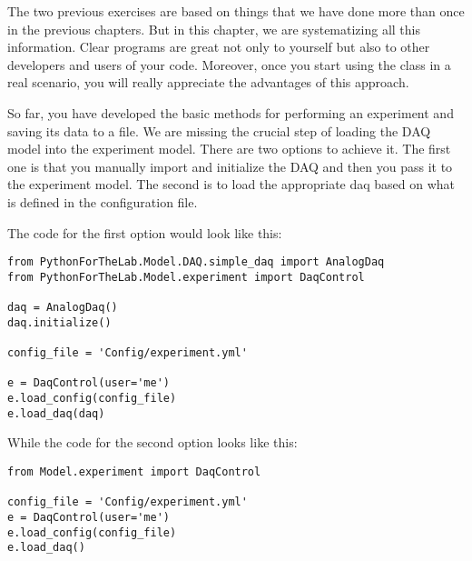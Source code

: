 
The two previous exercises are based on things that we have done more than once in the previous chapters. But in this chapter, we are systematizing all this information. Clear programs are great not only to yourself but also to other developers and users of your code. Moreover, once you start using the class in a real scenario, you will really appreciate the advantages of this approach.


So far, you have developed the basic methods for performing an experiment and saving its data to a file. We are missing the crucial step of loading the {DAQ} model into the experiment model. There are two options to achieve it. The first one is that you manually import and initialize the {DAQ} and then you pass it to the experiment model. The second is to load the appropriate daq based on what is defined in the configuration file.

The code for the first option would look like this:

\begin{verbatim}
from PythonForTheLab.Model.DAQ.simple_daq import AnalogDaq
from PythonForTheLab.Model.experiment import DaqControl

daq = AnalogDaq()
daq.initialize()

config_file = 'Config/experiment.yml'

e = DaqControl(user='me')
e.load_config(config_file)
e.load_daq(daq)
\end{verbatim}

While the code for the second option looks like this:

\begin{verbatim}
from Model.experiment import DaqControl

config_file = 'Config/experiment.yml'
e = DaqControl(user='me')
e.load_config(config_file)
e.load_daq()
\end{verbatim}

